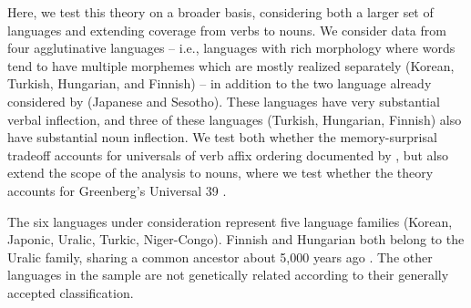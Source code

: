 \documentclass[11pt,letterpaper]{article}
\newcommand{\citep}{\parencite}
\newcommand{\citet}{\Textcite}
\newcommand\mhahn[1]{{\color{red}(#1)}}
\newcommand{\jd}[1]{\textcolor{Pink}{[jd: #1]}}
\begin{document}


Here, we test this theory on a broader basis, considering both a larger set of languages and extending coverage from verbs to nouns.
We consider data from four agglutinative languages -- i.e., languages with rich morphology where words tend to have multiple morphemes which are mostly realized separately (Korean, Turkish, Hungarian, and Finnish) -- in addition to the two language already considered by \citet{Hahn2020modeling} (Japanese and Sesotho).
These languages have very substantial verbal inflection, and three of these languages (Turkish, Hungarian, Finnish) also have substantial noun inflection. We test both whether the memory-surprisal tradeoff accounts for universals of verb affix ordering documented by \cite{bybee-morphology-1985}, but also extend the scope of the analysis to nouns, where we test whether the theory accounts for Greenberg's Universal 39 \citep{greenberg-universals-1963}. %


The six languages under consideration represent five language families (Korean, Japonic, Uralic, Turkic, Niger-Congo).
Finnish and Hungarian both belong to the Uralic family, sharing a common ancestor about 5,000 years ago \citep{maurits2020best}.
The other languages in the sample are not genetically related according to their generally accepted classification.




\end{document}
